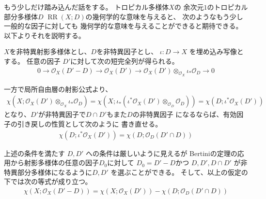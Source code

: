 \documentclass[a4paper,dvipdfmx,reqno,12pt]{amsart}
\theoremstyle{definition}
\newcommand{\opn}[1]{\operatorname{#1}}
\numberwithin{equation}{section}
\begin{document}
もう少しだけ踏み込んだ話をする。
トロピカル多様体$X$の
余次元$1$のトロピカル部分多様体$D$
$\opn{RR}(X;D)$の幾何学的な意味を与えると、
次のようなもう少し一般的な因子に対しても
幾何学的な意味を与えることができると期待できる。
以下よりそれを説明する。

$X$を非特異射影多様体とし、$D$を非特異因子とし、
$\iota\colon D\to X$ を埋め込み写像とする。
任意の因子 $D'$に対して次の短完全列が得られる。
\begin{align}
0 \to \mathcal{O}_X(D'-D)\to \mathcal{O}_X(D')
\to \mathcal{O}_X(D')
\otimes_{\mathcal{O}_X} \iota_*\mathcal{O}_D \to 0 
\end{align}

一方で局所自由層の射影公式より、
\begin{align}
\chi(X;\mathcal{O}_X(D')\otimes_{\mathcal{O}_X} \iota_*\mathcal{O}_D)
=\chi(X;\iota_*(\iota^{*}\mathcal{O}_X(D')\otimes_{\mathcal{O}_D} \mathcal{O}_D))
=\chi(D;\iota^{*}\mathcal{O}_X(D'))
\end{align}
となり、$D'$が非特異因子で$D\cap D'$もまた$D$の非特異因子
になるならば、有効因子の引き戻しの性質として次のように
書き直せる。
\begin{align}
\chi(D;\iota^{*}\mathcal{O}_X(D'))=\chi(D;\mathcal{O}_D(D'\cap D))
\end{align}

上述の条件を満たす $D,D'$ への条件は厳しいように見えるが
Bertiniの定理の応用から射影多様体の任意の因子$D_0$に対して
$D_0=D'-D$かつ
$D,D',D\cap D'$ が非特異部分多様体になるように$D,D'$
を選ぶことができる。
そして、以上の仮定の下では次の等式が成り立つ。
\begin{align}
\chi(X;\mathcal{O}_X(D'-D))=
\chi(X;\mathcal{O}_X(D'))-
\chi(D;\mathcal{O}_D(D'\cap D))
\end{align}
\end{document}
